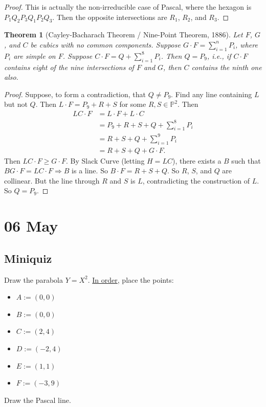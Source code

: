 \documentclass[12pt]{article}
\newcommand{\ita}[1]{\textit{#1}}
\newtheorem{theorem}{Theorem}[section]
\theoremstyle{definition}
\begin{document}
\begin{proof}
    This is actually the non-irreducible case of Pascal, where the hexagon is $P_1Q_2P_3Q_1P_2Q_3$. Then the opposite intersections are $R_1$, $R_2$, and $R_3$.
\end{proof}
\begin{theorem}[Cayley-Bacharach Theorem / Nine-Point Theorem, 1886]
    Let $F$, $G$, and $C$ be cubics with no common components. Suppose $G\cdot F=\sum\limits_{i=1}^nP_i$, where $P_i$ are simple on $F$. Suppose $C\cdot F=Q+\sum\limits_{i=1}^8P_i$. Then $Q=P_9$, \ita{i.e.}, if $C\cdot F$ contains eight of the nine intersections of $F$ and $G$, then $C$ contains the ninth one also.
\end{theorem}
\begin{proof}
    Suppose, to form a contradiction, that $Q\neq P_9$. Find any line containing $L$ but not $Q$. Then $L\cdot F=P_9+R+S$ for some $R,S\in\mathbb{P}^2$. Then
    \begin{align*}
        LC\cdot F&=L\cdot F+L\cdot C\\
        &=P_9+R+S+Q+\sum\limits_{i=1}^8P_i\\
        &=R+S+Q+\sum\limits_{i=1}^9P_i\\
        &=R+S+Q+G\cdot F.
    \end{align*}
    Then $LC\cdot F\geq G\cdot F$. By Slack Curve (letting $H=LC$), there exists a $B$ such that $BG\cdot F=LC\cdot F\Rightarrow B$ is a line. So $B\cdot F=R+S+Q$. So $R$, $S$, and $Q$ are collinear. But the line through $R$ and $S$ is $L$, contradicting the construction of $L$. So $Q=P_9$.
\end{proof}
\section{06 May}
\subsection{Miniquiz}
Draw the parabola $Y=X^2$. \underline{In order}, place the points:
\begin{multicols}{2}
    \begin{itemize}
        \item $A:=(0,0)$
        \item $B:=(0,0)$
        \item $C:=(2,4)$
        \item $D:=(-2,4)$
        \item $E:=(1,1)$
        \item $F:=(-3,9)$
    \end{itemize}
\end{multicols}
Draw the Pascal line.
\end{document}
